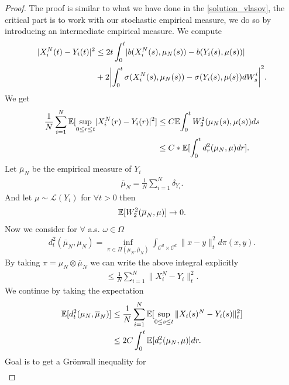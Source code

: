\begin{proof}
  The proof is similar to what we have done in the \autoref{solution_vlasov}, the critical part is to 
  work with our stochastic empirical measure, we do so by introducing an intermediate empirical measure. We compute 
  \begin{align*}
    \abs{X_i^{N}(t) - Y_i(t) }^2 &\le 2 t \int_0^{t} \abs{b(X^{N}_i(s),\mu_N(s) ) -  b(Y_i(s),\mu(s) )} \\
    &+ 2 \abs*{\int_0^{t} \sigma(X_i^{N}(s),\mu_N(s) ) - \sigma(Y_i(s),\mu(s))  dW_s^{i} }^2
  .\end{align*}
   We get %
  \begin{align*}
    \frac{1}{N}\sum_{i=1}^{N} \mathbb{E}[\sup_{0\le r\le t} \lvert X_i^{N}(r) - Y_i(r) \rvert^2] &\le C \mathbb{E}{\int_0^{t} W_2^{2}(\mu_N(s),\mu(s))  } ds\\
                                                        &\le  C*\mathbb{E}[\int_0^{t} d_r^2(\mu_N,\mu ) dr]
  .\end{align*}
  Let $\overline{\mu }_N $ be the empirical measure of $Y_i$ 
  \begin{align*}
    \overline{\mu }_N = \frac{1}{N} \sum_{i=1}^{N} \delta_{Y_i}  
  .\end{align*}
  And let $\mu \sim \mathcal{L}(Y_i)$ for $\forall  t > 0$ then 
  \begin{align*}
    \mathbb{E}[W_2^2(\overline{\mu }_N,\mu  )] \to  0
  .\end{align*}
  Now we consider for $\forall $ a.s. $\omega  \in  \Omega $
  \begin{align*}
    d_t^2(\overline{\mu }_N,\mu_N ) = \inf_{\pi  \in  \Pi(\mu_N,\overline{\mu }_N )} \int_{\mathcal{C}^{d} \times  \mathcal{C}^{d}  } \|x-y\|^2_t d\pi(x,y) 
  .\end{align*}
  By taking $\pi  = \mu_N \otimes \overline{\mu }_N $ we can write the above integral explicitly 
  \begin{align*}
    \le \frac{1}{N} \sum_{i=1}^{N} \|X^{N}_i - Y_i \|_t^2 
  .\end{align*}
  We continue by taking the expectation
  \begin{align*}
    \mathbb{E}[d_t^2(\mu_N,\overline{\mu }_N )] &\le  \frac{1}{N} \sum_{i=1}^{N} \mathbb{E}[\sup_{0\le s \le t} \|X_i(s)^{N} - Y_i(s) \|_t^2] \\
                                        &\le 2C\int_0^{t} \mathbb{E}[d_r^2(\mu_N,\mu )] dr 
  .\end{align*}
  Goal is to get a Grönwall inequality for 
  \begin{align*}

\end{align*}
\end{proof}
